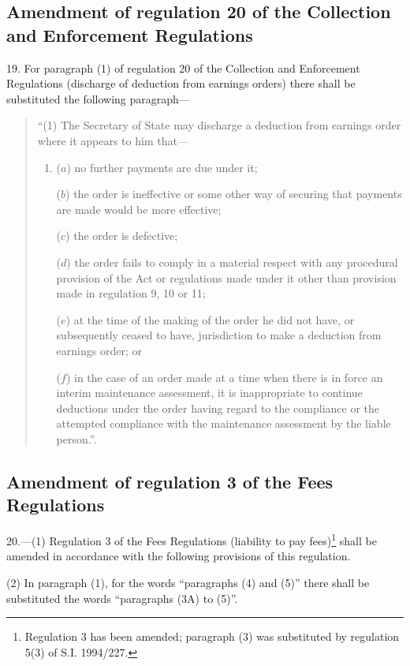 \documentclass[a4paper]{article}
\begin{document}
\subsection[19. Amendment of regulation 20 of the Collection and Enforcement Regulations]{Amendment of regulation 20 of the Collection and Enforcement Regulations}

19.  For paragraph (1) of regulation 20 of the Collection and Enforcement Regulations (discharge of deduction from earnings orders) there shall be substituted the following paragraph—
\begin{quotation}
“(1) The Secretary of State may discharge a deduction from earnings order where it appears to him that—
\begin{enumerate}\item[]
($a$) no further payments are due under it;

($b$) the order is ineffective or some other way of securing that payments are made would be more effective;

($c$) the order is defective;

($d$) the order fails to comply in a material respect with any procedural provision of the Act or regulations made under it other than provision made in regulation 9, 10 or 11;

($e$) at the time of the making of the order he did not have, or subsequently ceased to have, jurisdiction to make a deduction from earnings order; or

($f$) in the case of an order made at a time when there is in force an interim maintenance assessment, it is inappropriate to continue deductions under the order having regard to the compliance or the attempted compliance with the maintenance assessment by the liable person.”.
\end{enumerate}
\end{quotation}

\subsection[20. Amendment of regulation 3 of the Fees Regulations]{Amendment of regulation 3 of the Fees Regulations}

20.—(1) Regulation 3 of the Fees Regulations (liability to pay fees)\footnote{\frenchspacing Regulation 3 has been amended; paragraph (3) was substituted by regulation 5(3) of S.I. 1994/227.} shall be amended in accordance with the following provisions of this regulation.

(2) In paragraph (1), for the words “paragraphs (4) and (5)” there shall be substituted the words “paragraphs (3A) to (5)”.
\end{document}
